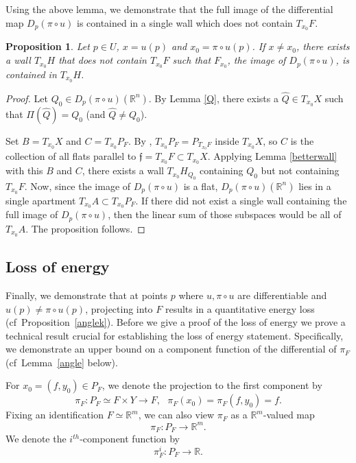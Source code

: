 \documentclass[12pt]{amsart}
\newtheorem{proposition}[theorem]{Proposition}
\theoremstyle{definition}
\numberwithin{equation}{section}
\newcommand{\R}{\mathbb R}
\newcommand{\PF}{P_F}
\begin{document}
Using the above lemma, we demonstrate that the full image of the differential map $D_p(\pi \circ u)$ is contained in a single wall which does not contain $T_{x_0}F$.
\begin{proposition} \label{lemma:star}
Let $p \in U$, $x=u(p)$ and $x_0=\pi \circ u(p)$. 
If $x \neq x_0$, there exists a   wall $T_{x_0}H$ that does not contain $T_{x_0}F$ 
such that $F_{x_0}$, the image of $D_p(\pi \circ u)$, is contained in $T_{x_0}H$.
\end{proposition}

\begin{proof}
Let $Q_0 \in D_p(\pi \circ u)(\R^n)$. By Lemma \ref{Q}, there exists a $\hat Q \in T_{x_0}X$ such that $\Pi(\hat Q) = Q_0$ (and $\hat Q \neq Q_0$). 

Set $B=T_{x_0}X$ and $C=T_{x_0}\PF$. By \cite[Corollary 3.6]{ahl},  $T_{x_0}\PF = P_{T_{x_0}F}$ inside $T_{x_0}X$,  so $C$ is the collection of all flats parallel to $\mathfrak f =T_{x_0}F \subset T_{x_0}X$. Applying Lemma \ref{betterwall} with this $B$ and $C$, there exists a wall $T_{x_0}H_{Q_0}$ containing $Q_0$ but not containing $T_{x_0}F$.
Now, since the image of $D_p(\pi \circ u)$ is a flat, $D_p(\pi \circ u)(\R^n)$ lies in a single apartment $T_{x_0}A \subset T_{x_0}P_F$. If there did not exist a single wall containing the full image of $D_p(\pi \circ u)$, then the linear sum of those subspaces would be all of $T_{x_0}A$. The proposition follows.\end{proof}



\subsection{Loss of energy} 
\label{sec:projectionsetup}
Finally, we demonstrate that at points $p$ where $u, \pi\circ u$ are differentiable and $u(p) \neq \pi \circ u(p)$, projecting into $F$ results in a quantitative energy loss (cf~Proposition~\ref{anglek}). Before we give a proof of the loss of energy we prove a technical result crucial for establishing the loss of energy statement. Specifically, we demonstrate an upper bound on a component function of the differential of $\pi_F$
(cf~Lemma~\ref{angle} below).

 
For $x_0=(f,y_0) \in \PF$, we denote the projection to the first component  by 
\[
\pi_F:\PF \simeq F \times Y \to F, \ \ \ \pi_F(x_0)=\pi_F(f,y_0)=f.
\]
Fixing an identification $F \simeq \R^m$, we can also view $\pi_F$ as a $\R^m$-valued map
\[
\pi_F:\PF \to \R^m.
\]
We denote the   $i^{th}$-component function by 
$$\pi_F^i:\PF \to \R.
$$ 
\end{document}
